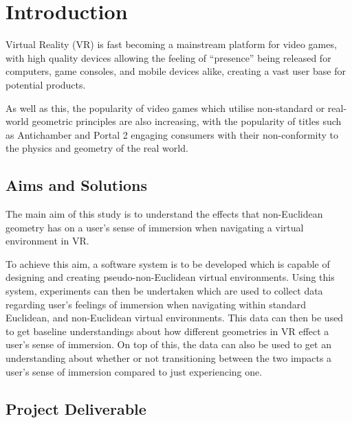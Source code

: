 \chapter{Introduction}
\label{intro}

	Virtual Reality (VR) is fast becoming a mainstream platform for video games, with high quality devices allowing the feeling of \enquote{presence} being released for computers, game consoles, and mobile devices alike, creating a vast user base for potential products.

	As well as this, the popularity of video games which utilise non-standard or real-world geometric principles are also increasing, with the popularity of titles such as Antichamber \cite{Antichamber2013} and Portal 2 \cite{Portal22011} engaging consumers with their non-conformity to the physics and geometry of the real world.

	\section{Aims and Solutions}

		The main aim of this study is to understand the effects that non-Euclidean geometry has on a user's sense of immersion when navigating a virtual environment in VR.

		To achieve this aim, a software system is to be developed which is capable of designing and creating pseudo-non-Euclidean virtual environments.
		Using this system, experiments can then be undertaken which are used to collect data regarding user's feelings of immersion when navigating within standard Euclidean, and non-Euclidean virtual environments.
		This data can then be used to get baseline understandings about how different geometries in VR effect a user's sense of immersion.
		On top of this, the data can also be used to get an understanding about whether or not transitioning between the two impacts a user's sense of immersion compared to just experiencing one.

	\section{Project Deliverable}

